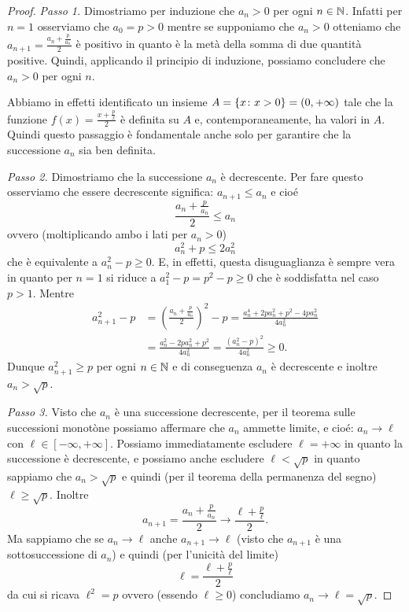 \begin{proof}
\emph{Passo 1.} Dimostriamo per induzione che $a_n>0$ per ogni $n\in \mathbb N$.
Infatti per $n=1$ osserviamo che $a_0=p>0$ mentre se supponiamo che
$a_n>0$ otteniamo che $a_{n+1} = \frac{a_n + \frac p {a_n}}2$ è positivo in quanto
è la metà della somma di due quantità positive. Quindi, applicando il
principio di induzione, possiamo concludere che $a_n>0$ per ogni $n$.

Abbiamo in effetti identificato un insieme $A={\left\{ x\colon x>0 \right\}} = (0,
+\infty)$ tale che la funzione $f(x) = \frac{x + \frac p x}{2}$ è definita
su $A$ e, contemporaneamente, ha valori in $A$.
Quindi questo passaggio è fondamentale anche solo per
garantire che la successione $a_n$ sia ben definita.

\emph{Passo 2.} Dimostriamo che la successione $a_n$ è decrescente.
Per fare questo osserviamo che essere decrescente significa:
$ a_{n+1} \le a_n$
e cioé
\[
\frac{a_n + \frac p {a_n}}{2} \le a_n
\]
ovvero (moltiplicando ambo i lati per $a_n>0$)
\[
a_n^2 + p \le 2 a_n^2
\]
che è equivalente a $a_n^2 - p \ge 0$. E, in effetti, questa
disuguaglianza è sempre vera in quanto per $n=1$ si riduce a $a_1^2 - p
= p^2 - p \ge 0$ che è soddisfatta nel caso $p>1$. Mentre
\begin{align*}
a_{n+1}^2 - p & = \left(\frac{a_n+\frac p{a_n}}{2}\right)^2 - p
= \frac{a_n^4 + 2 p a_n^2 + p^2 - 4 p a_n^2}{4 a_n^2} \\
& = \frac{a_n^2 - 2 p a_n^2 + p^2}{4 a_n^2}
 = \frac{\left(a_n^2 - p\right)^2}{4a_n^2} \ge 0.
\end{align*}
Dunque $a_{n+1}^2 \ge p$ per ogni $n\in \mathbb N$ e di conseguenza $a_n$ è
decrescente e inoltre $a_n > \sqrt p$.

\emph{Passo 3.}
Visto che $a_n$ è una successione decrescente,
per il teorema sulle successioni monotòne possiamo
affermare che $a_n$ ammette limite, e cioé: $a_n \to \ell$ con $\ell
\in [-\infty, +\infty]$. Possiamo immediatamente escludere
$\ell=+\infty$ in quanto la successione è decrescente, e possiamo
anche escludere $\ell<\sqrt{p}$ in quanto sappiamo che $a_n > \sqrt{p}$ e quindi
(per il teorema della permanenza del segno) $\ell \ge \sqrt p$.
Inoltre
\[
  a_{n+1} = \frac{a_n + \frac p{a_n}}{2} \to \frac{\ell + \frac p \ell}{2}.
\]
Ma sappiamo che se $a_n\to \ell$ anche $a_{n+1}\to \ell$ (visto che
$a_{n+1}$ è una sottosuccessione di $a_n$) e quindi (per l'unicità del
limite)
\begin{equation}\label{ex_1_fixed}
  \ell = \frac{\ell + \frac p \ell}{2}
\end{equation}
da cui si ricava $\ell^2 = p$ ovvero (essendo $\ell\ge 0$) concludiamo
$a_n \to \ell =
\sqrt p$.
\end{proof}

